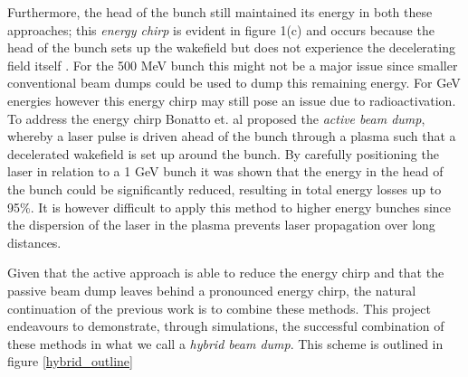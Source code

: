 Furthermore, the head of the bunch still maintained its energy in both these approaches; this \textit{energy chirp} is evident in figure 1(c) and occurs because the head of the bunch sets up the wakefield but does not experience the decelerating field itself \cite{Wu2010}. For the 500 MeV bunch this might not be a major issue since smaller conventional beam dumps could be used to dump this remaining energy. For GeV energies however this energy chirp may still pose an issue due to radioactivation. 
To address the energy chirp Bonatto et. al \cite{Bonatto2015} proposed the \textit{active beam dump}, whereby a laser pulse is driven ahead of the bunch through a plasma such that a decelerated wakefield is set up around the bunch. 
By carefully positioning the laser in relation to a 1 GeV bunch it was shown that the energy in the head of the bunch could be significantly reduced, resulting in total energy losses up to 95\%. It is however difficult to apply this method to higher energy bunches since the dispersion of the laser in the plasma prevents laser propagation over long distances. 


Given that the active approach is able to reduce the energy chirp and that the passive beam dump leaves behind a pronounced energy chirp, the natural continuation of the previous work is to combine these methods. This project endeavours to demonstrate, through simulations, the successful combination of these methods in what we call a \textit{hybrid beam dump}. This scheme is outlined in figure \ref{hybrid_outline}







